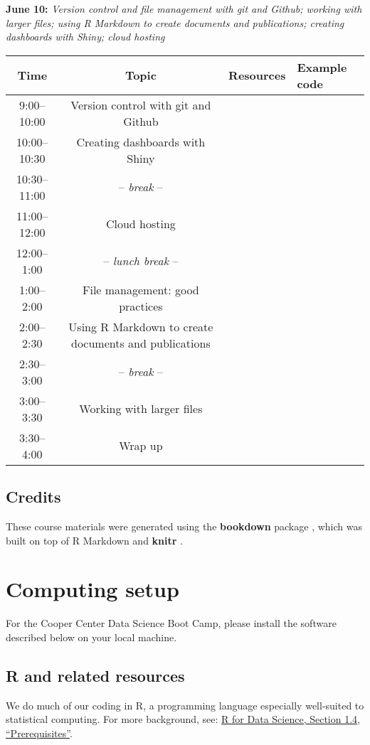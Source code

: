 \documentclass[
]{book}
\begin{document}
\textbf{June 10:} \emph{Version control and file management with git and Github; working with larger files; using R Markdown to create documents and publications; creating dashboards with Shiny; cloud hosting}

\begin{longtable}[]{@{}ccll@{}}
\toprule
Time & Topic & Resources & Example code\tabularnewline
\midrule
\endhead
9:00--10:00 & Version control with git and Github & &\tabularnewline
10:00--10:30 & Creating dashboards with Shiny & &\tabularnewline
10:30--11:00 & -- \emph{break} -- & &\tabularnewline
11:00--12:00 & Cloud hosting & &\tabularnewline
12:00--1:00 & -- \emph{lunch break} -- & &\tabularnewline
1:00--2:00 & File management: good practices & &\tabularnewline
2:00--2:30 & Using R Markdown to create documents and publications & &\tabularnewline
2:30--3:00 & -- \emph{break} -- & &\tabularnewline
3:00--3:30 & Working with larger files & &\tabularnewline
3:30--4:00 & Wrap up & &\tabularnewline
\bottomrule
\end{longtable}

\hypertarget{credits}{%
\section{Credits}\label{credits}}

These course materials were generated using the \textbf{bookdown} package \citep{R-bookdown}, which was built on top of R Markdown and \textbf{knitr} \citep{xie2015}.

\hypertarget{computing-setup}{%
\chapter{Computing setup}\label{computing-setup}}

For the Cooper Center Data Science Boot Camp, please install the software described below on your local machine.

\hypertarget{r-and-related-resources}{%
\section{R and related resources}\label{r-and-related-resources}}

We do much of our coding in R, a programming language especially well-suited to statistical computing. For more background, see: \href{https://r4ds.had.co.nz/introduction.html\#prerequisites}{R for Data Science, Section 1.4, ``Prerequisites''}.
\end{document}
